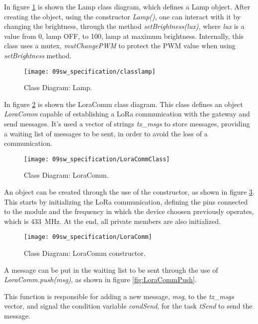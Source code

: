 
In figure \ref{fig:classlamp} is shown the Lamp class diagram, which defines a Lamp object. After creating the object, using the constructor \textit{Lamp()}, one can interact with it by changing the brightness, through the method \textit{setBrightness(lux)}, where \textit{lux} is a value from 0, lamp OFF, to 100, lamp at maximum brightness. Internally, this class uses a mutex, \textit{mutChangePWM} to protect the PWM value when using \textit{setBrightness} method. 

\begin{figure}[H]
	\centering
	\texttt{[image: 09sw\_specification/classlamp]}
	\caption{Class Diagram: Lamp.}
	\label{fig:classlamp}
\end{figure}


In figure \ref{fig:LoraCommClass} is shown the LoraComm class diagram. This class defines an object \textit{LoraComm} capable of establishing a LoRa communication with the gateway and send messages. It's used a vector of strings \textit{tx\_msgs} to store messages, providing a waiting list of messages to be sent, in order to avoid the loss of a communication.

\begin{figure}[H]
	\centering
	\texttt{[image: 09sw\_specification/LoraCommClass]}
	\caption{Class Diagram: LoraComm.}
	\label{fig:LoraCommClass}
\end{figure}

An object can be created through the use of the constructor, as shown in figure \ref{fig:LoraComm}.
This starts by initializing the LoRa communication, defining the pins connected to the module and the frequency in which the device choosen previously operates, which is 433~MHz. At the end, all private members are also initialized.

\begin{figure}[H]
	\centering
	\texttt{[image: 09sw\_specification/LoraComm]}
	\caption{Class Diagram: LoraComm constructor.}
	\label{fig:LoraComm}
\end{figure}

A message can be put in the waiting list to be sent through the use of \textit{LoraComm.push(msg)}, as shown in figure \ref{fig:LoraCommPush}.

This function is responsible for adding a new message, \textit{msg}, to the \textit{tx\_msgs} vector, and signal the condition variable \textit{condSend}, for the task \textit{tSend} to send the message.

